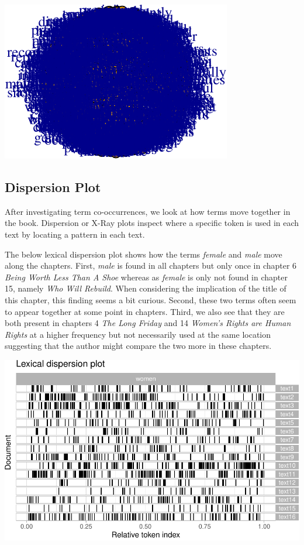 \documentclass[
]{article}
\begin{document}
\begin{center}\includegraphics[width=0.7\linewidth]{report_files/figure-latex/network-1} \end{center}

\hypertarget{dispersion-plot}{%
\subsection{Dispersion Plot}\label{dispersion-plot}}

After investigating term co-occurrences, we look at how terms move
together in the book. Dispersion or X-Ray plots inspect where a specific
token is used in each text by locating a pattern in each text.

The below lexical dispersion plot shows how the terms \emph{female} and
\emph{male} move along the chapters. First, \emph{male} is found in all
chapters but only once in chapter 6 \emph{Being Worth Less Than A Shoe}
whereas as \emph{female} is only not found in chapter 15, namely
\emph{Who Will Rebuild}. When considering the implication of the title
of this chapter, this finding seems a bit curious. Second, these two
terms often seem to appear together at some point in chapters. Third, we
also see that they are both present in chapters 4 \emph{The Long Friday}
and 14 \emph{Women's Rights are Human Rights} at a higher frequency but
not necessarily used at the same location suggesting that the author
might compare the two more in these chapters.

\begin{center}\includegraphics[width=0.7\linewidth]{report_files/figure-latex/xray plot-1} \end{center}
\end{document}
